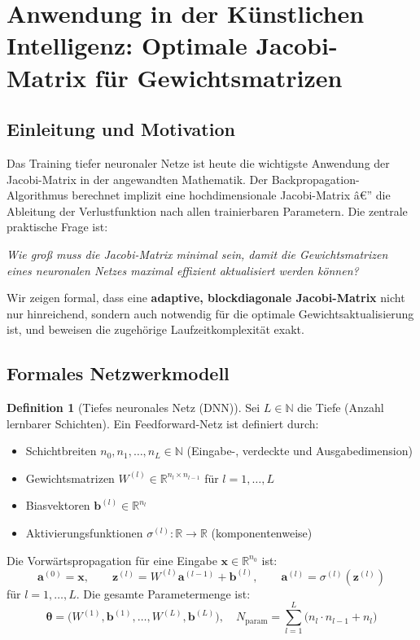 ﻿\documentclass[a4paper,12pt]{article}
\theoremstyle{definition}
\newtheorem{definition}{Definition}
\begin{document}
\newpage
\section{Anwendung in der Künstlichen Intelligenz: Optimale Jacobi-Matrix für Gewichtsmatrizen}

\subsection{Einleitung und Motivation}

Das Training tiefer neuronaler Netze ist heute die wichtigste Anwendung der Jacobi-Matrix in der angewandten Mathematik. Der Backpropagation-Algorithmus berechnet implizit eine hochdimensionale Jacobi-Matrix â€” die Ableitung der Verlustfunktion nach allen trainierbaren Parametern. Die zentrale praktische Frage ist:

\begin{center}
\textit{Wie groß muss die Jacobi-Matrix minimal sein, damit die Gewichtsmatrizen eines neuronalen Netzes maximal effizient aktualisiert werden können?}
\end{center}

Wir zeigen formal, dass eine \textbf{adaptive, blockdiagonale Jacobi-Matrix} nicht nur hinreichend, sondern auch notwendig für die optimale Gewichtsaktualisierung ist, und beweisen die zugehörige Laufzeitkomplexität exakt.

\subsection{Formales Netzwerkmodell}

\begin{definition}[Tiefes neuronales Netz (DNN)]
	\label{def:dnn}
	Sei $L \in \mathbb{N}$ die Tiefe (Anzahl lernbarer Schichten). Ein Feedforward-Netz ist definiert durch:
	\begin{itemize}
		\item Schichtbreiten $n_0, n_1, \ldots, n_L \in \mathbb{N}$ (Eingabe-, verdeckte und Ausgabedimension)
		\item Gewichtsmatrizen $W^{(l)} \in \mathbb{R}^{n_l \times n_{l-1}}$ für $l = 1, \ldots, L$
		\item Biasvektoren $\boldsymbol{b}^{(l)} \in \mathbb{R}^{n_l}$
		\item Aktivierungsfunktionen $\sigma^{(l)}: \mathbb{R} \to \mathbb{R}$ (komponentenweise)
	\end{itemize}
	Die Vorwärtspropagation für eine Eingabe $\boldsymbol{x} \in \mathbb{R}^{n_0}$ ist:
	\[
	\boldsymbol{a}^{(0)} = \boldsymbol{x}, \qquad
	\boldsymbol{z}^{(l)} = W^{(l)} \boldsymbol{a}^{(l-1)} + \boldsymbol{b}^{(l)}, \qquad
	\boldsymbol{a}^{(l)} = \sigma^{(l)}(\boldsymbol{z}^{(l)})
	\]
	für $l = 1, \ldots, L$. Die gesamte Parametermenge ist:
	\[
	\boldsymbol{\theta} = \bigl(W^{(1)}, \boldsymbol{b}^{(1)}, \ldots, W^{(L)}, \boldsymbol{b}^{(L)}\bigr),
	\quad
	N_{\mathrm{param}} = \sum_{l=1}^L \bigl(n_l \cdot n_{l-1} + n_l\bigr)
	\]
\end{definition}
\end{document}
